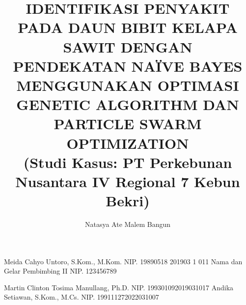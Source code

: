 \documentclass[11pt, onecolumn, twoside, final]{report}
\begin{document}

    
    \title{IDENTIFIKASI PENYAKIT PADA DAUN BIBIT KELAPA SAWIT DENGAN PENDEKATAN NAÏVE BAYES MENGGUNAKAN OPTIMASI GENETIC ALGORITHM DAN PARTICLE SWARM OPTIMIZATION\\[0.2cm]{\normalfont\normalsize(Studi Kasus: PT Perkebunan Nusantara IV Regional 7 Kebun Bekri)}}      %
    
    \author{Natasya Ate Malem Bangun}		%
	
	\dosbingA%
		{Meida Cahyo Untoro, S.Kom., M.Kom.}%
		{NIP. 19890518 201903 1 011}				%
	\dosbingB%
		{Nama dan Gelar Pembimbing II}%
		{NIP. 123456789}				%
		
	\pengujiA%
		{Martin Clinton Tosima Manullang, Ph.D.}%
		{NIP. 199301092019031017}				%
	\pengujiB%
		{Andika Setiawan, S.Kom., M.Cs.}%
		{NIP. 199111272022031007}				%

	\sloppy %

    

    \clearpage
    \setcounter{page}{2}    %

    \fancyhf{} %
    \renewcommand{\headrulewidth}{0pt}
    \fancyhead[R]{\thepage} %
    \pagestyle{fancy}
\end{document}
